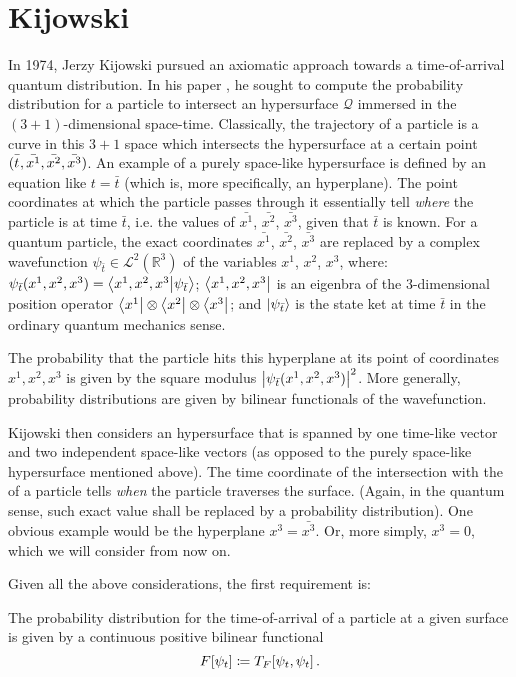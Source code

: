 \section{Kijowski}\label{sec:kijowski}

In 1974, Jerzy Kijowski pursued an axiomatic approach towards a
time-of-arrival quantum distribution. In his paper \parencite{Kijowski}, he sought to compute
the probability distribution for a particle to intersect an hypersurface
$\mathcal{Q}$ immersed in the $(3+1)$-dimensional space-time.
Classically, the trajectory of a particle is a curve in this $3+1$ space
which intersects the hypersurface at a certain point $(\bar{t^{\vphantom{1em}}}, \bar{x^1}, \bar{x^2}, \bar{x^3})$.
An example of a purely
space-like hypersurface is defined by an equation like
$t=\bar{t}$ (which is, more specifically, an hyperplane).
The point coordinates
at which the particle passes through it
essentially tell \emph{where}
the particle is at time $\bar{t}$,
i.e. the values of $\bar{x^1}$, $\bar{x^2}$, $\bar{x^3}$,
given that $\bar{t}$ is known.
For a quantum particle, the exact coordinates $\bar{x^1}$, $\bar{x^2}$, $\bar{x^3}$
are replaced by a complex wavefunction $\psi_{\bar{t}} \in \mathscr{L}^2(\mathbb{R}^3)$
of the variables $x^1$, $x^2$, $x^3$,
where:
$\psi_{\bar{t}}(x^1, x^2, x^3) = \braket{x^1, x^2, x^3}{\psi_{\bar{t}}}$;
$\bra{x^1, x^2, x^3}$ is an eigenbra of the 3-dimensional position operator $\bra{x^1} \otimes \bra{x^2} \otimes \bra{x^3}$;
and $\ket{\psi_{\bar{t}}}$ is the state ket at time $\bar{t}$ in the ordinary quantum mechanics sense.

The probability that the particle hits this hyperplane at its point of coordinates $x^1, x^2, x^3$
is given by the square modulus $\abs{\psi_{\bar{t}}(x^1, x^2, x^3)}^2$.
More generally, probability distributions are given by bilinear functionals of the wavefunction.

Kijowski then considers an hypersurface that is spanned by one time-like vector and two independent
space-like vectors (as opposed to the purely space-like hypersurface mentioned above).
The time coordinate of the intersection with the 
of a particle tells \emph{when} the particle traverses the surface.
(Again, in the quantum sense, such exact value shall be replaced by a probability distribution).
One obvious example would be the hyperplane $x^3 = \bar{x^3}$.
Or, more simply, $x^3 = 0$, which we will consider from now on.

Given all the above considerations, the first requirement is:
\begin{axiom}\label{ax:kijowski:first}
  The probability distribution for the time-of-arrival of a particle at a given surface
  is given by a continuous positive bilinear functional
  \begin{equation*}
    F[\psi_{t}] \coloneqq T_F[\psi_{t}, \psi_{t}] \, \text{.}
  \end{equation*}
\end{axiom}


